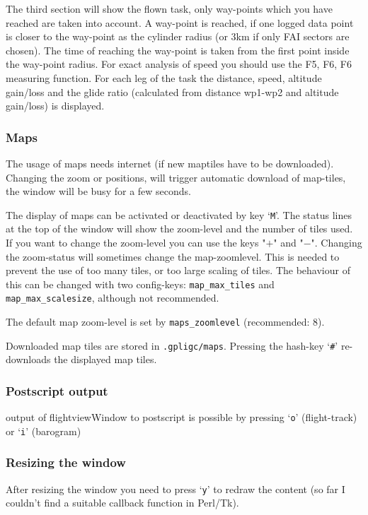 The third section will show the flown task, only way-points which you have reached are taken into account. A way-point is reached, if one logged data point is closer to the way-point as the cylinder radius (or 3km if only FAI sectors are chosen). The time of reaching the way-point is taken from the first point inside the way-point radius.
For exact analysis of speed you should use the F5, F6, F6 measuring function.
For each leg of the task the distance, speed, altitude gain/loss and the glide ratio (calculated from distance wp1-wp2 and altitude gain/loss) is displayed.


\subsubsection{Maps}
The usage of maps needs internet (if new maptiles have to be downloaded).
Changing the zoom or positions, will trigger automatic download of map-tiles, the window will be busy for a few seconds.

The display of maps can be activated or deactivated by key `\texttt{M}'.
The status lines at the top of the window will show the zoom-level and the number of tiles used.
If you want to change the zoom-level you can use the keys "$+$" and "$-$".
Changing the zoom-status will sometimes change the map-zoomlevel. This is needed to prevent
the use of too many tiles, or too large scaling of tiles.
The behaviour of this can be changed with two config-keys:
\texttt{map\_max\_tiles}
and \texttt{map\_max\_scalesize}, although not recommended.

The default map zoom-level is set by \texttt{maps\_zoomlevel} (recommended: 8).

Downloaded map tiles are stored in \texttt{.gpligc/maps}. Pressing the hash-key `\texttt{\#}' re-downloads the displayed map tiles.


\subsubsection{Postscript output}
output of flightviewWindow to postscript is possible by pressing `\texttt{o}' (flight-track)
or `\texttt{i}' (barogram)

\subsubsection{Resizing the window}
After resizing the window you need to press `\texttt{y}' to redraw the content (so far I couldn't find a suitable callback function in Perl/Tk).


